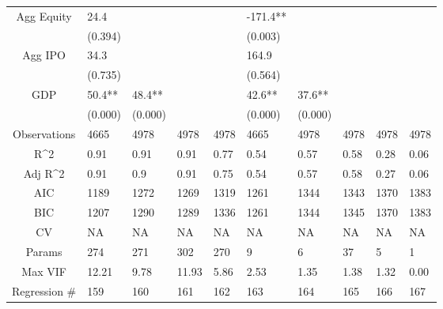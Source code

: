\documentclass{article}
\begin{document}
\begin{table}[H]
\begin{tabular}{|clllllllll|}
  Agg Equity & 24.4 &  &  &  & -171.4** &  &  &  &  \\ 
   & (0.394) &  &  &  & (0.003) &  &  &  &  \\ 
  Agg IPO & 34.3 &  &  &  & 164.9 &  &  &  &  \\ 
   & (0.735) &  &  &  & (0.564) &  &  &  &  \\ 
  GDP & 50.4** & 48.4** &  &  & 42.6** & 37.6** &  &  &  \\ 
   & (0.000) & (0.000) &  &  & (0.000) & (0.000) &  &  &  \\ 
  \hline 
 Observations & 4665 & 4978 & 4978 & 4978 & 4665 & 4978 & 4978 & 4978 & 4978 \\ 
  R^2 & 0.91 & 0.91 & 0.91 & 0.77 & 0.54 & 0.57 & 0.58 & 0.28 & 0.06 \\ 
  Adj R^2 & 0.91 & 0.9 & 0.91 & 0.75 & 0.54 & 0.57 & 0.58 & 0.27 & 0.06 \\ 
  AIC & 1189 & 1272 & 1269 & 1319 & 1261 & 1344 & 1343 & 1370 & 1383 \\ 
  BIC & 1207 & 1290 & 1289 & 1336 & 1261 & 1344 & 1345 & 1370 & 1383 \\ 
  CV & NA & NA & NA & NA & NA & NA & NA & NA & NA \\ 
  Params & 274 & 271 & 302 & 270 & 9 & 6 & 37 & 5 & 1 \\ 
  Max VIF & 12.21 & 9.78 & 11.93 & 5.86 & 2.53 & 1.35 & 1.38 & 1.32 & 0.00 \\ 
  Regression \# & 159 & 160 & 161 & 162 & 163 & 164 & 165 & 166 & 167 \\ 
   \hline
\end{tabular}
 
\end{table}
\end{document}
